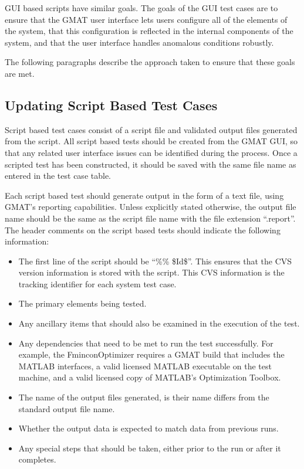 GUI based scripts have similar goals.  The goals of the GUI test cases are to ensure that the GMAT
user interface lets users configure all of the elements of the system, that this configuration is
reflected in the internal components of the system, and that the user interface handles anomalous
conditions robustly.

The following paragraphs describe the approach taken to ensure that these goals are met.

\subsection{Updating Script Based Test Cases}

Script based test cases consist of a script file and validated output files generated from the
script.  All script based tests should be created from the GMAT GUI, so that any related user
interface issues can be identified during the process.  Once a scripted test has been constructed,
it should be saved with the same file name as entered in the test case table.

Each script based test should generate output in the form of a text file, using GMAT's reporting
capabilities.  Unless explicitly stated otherwise, the output file name should be the same as the
script file name with the file extension ``.report''.  The header comments on the script based tests
should indicate the following information:

\begin{itemize}
\item The first line of the script should be ``\%\% \$Id\$''.  This ensures that the CVS
version information is stored with the script.  This CVS information is the tracking identifier for
each system test case.
\item The primary elements being tested.
\item Any ancillary items that should also be examined in the execution of the test.
\item Any dependencies that need to be met to run the test successfully.  For example, the
FminconOptimizer requires a GMAT build that includes the MATLAB interfaces, a valid licensed MATLAB
executable on the test machine, and a valid licensed copy of MATLAB's Optimization Toolbox.
\item The name of the output files generated, is their name differs from the standard output file
name.
\item Whether the output data is expected to match data from previous runs.
\item Any special steps that should be taken, either prior to the run or after it completes.
\end{itemize}

